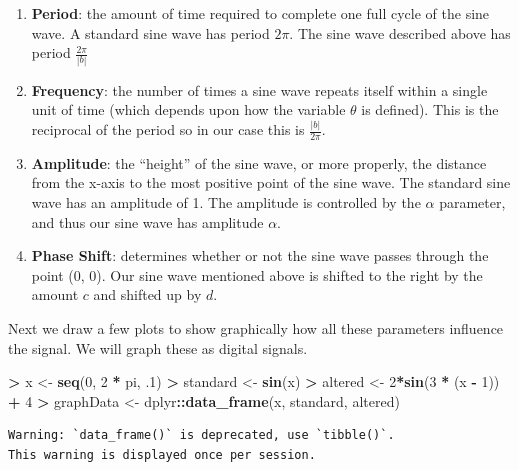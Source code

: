 \documentclass[]{krantz}
\makeatletter
\newenvironment{Shaded}{\begin{snugshade}}{\end{snugshade}}
\newcommand{\DecValTok}[1]{\textcolor[rgb]{0.06,0.06,0.06}{#1}}
\newcommand{\FloatTok}[1]{\textcolor[rgb]{0.06,0.06,0.06}{#1}}
\newcommand{\KeywordTok}[1]{\textcolor[rgb]{0.27,0.27,0.27}{\textbf{#1}}}
\newcommand{\NormalTok}[1]{#1}
\newcommand{\OperatorTok}[1]{\textcolor[rgb]{0.43,0.43,0.43}{\textbf{#1}}}
\newcommand{\StringTok}[1]{\textcolor[rgb]{0.5,0.5,0.5}{#1}}
\providecommand{\tightlist}{%
  \setlength{\itemsep}{0pt}\setlength{\parskip}{0pt}}
\newenvironment{kframe}{%
\medskip{}
\setlength{\fboxsep}{.8em}
 \def\at@end@of@kframe{}%
 \ifinner\ifhmode%
  \def\at@end@of@kframe{\end{minipage}}%
  \begin{minipage}{\columnwidth}%
 \fi\fi%
 \def\FrameCommand##1{\hskip\@totalleftmargin \hskip-\fboxsep
 \colorbox{shadecolor}{##1}\hskip-\fboxsep
     \hskip-\linewidth \hskip-\@totalleftmargin \hskip\columnwidth}%
 \MakeFramed {\advance\hsize-\width
   \@totalleftmargin\z@ \linewidth\hsize
   \@setminipage}}%
 {\par\unskip\endMakeFramed%
 \at@end@of@kframe}
\renewenvironment{Shaded}{\begin{kframe}}{\end{kframe}}
\makeatother
\begin{document}
\begin{enumerate}
\def\labelenumi{\arabic{enumi}.}
\tightlist
\item
  \textbf{Period}: the amount of time required to complete one full cycle of the sine wave. A standard sine wave has period \(2\pi\). The sine wave described above has period \(\frac{2\pi}{|b|}\)
\item
  \textbf{Frequency}: the number of times a sine wave repeats itself within a single unit of time (which depends upon how the variable \(\theta\) is defined). This is the reciprocal of the period so in our case this is \(\frac{|b|}{2\pi}\).
\item
  \textbf{Amplitude}: the ``height'' of the sine wave, or more properly, the distance from the x-axis to the most positive point of the sine wave. The standard sine wave has an amplitude of 1. The amplitude is controlled by the \(\alpha\) parameter, and thus our sine wave has amplitude \(\alpha\).
\item
  \textbf{Phase Shift}: determines whether or not the sine wave passes through the point (0, 0). Our sine wave mentioned above is shifted to the right by the amount \(c\) and shifted up by \(d\).
\end{enumerate}

Next we draw a few plots to show graphically how all these parameters influence the signal. We will graph these as digital signals.

\begin{Shaded}
\begin{Highlighting}[]
\OperatorTok{>}\StringTok{ }\NormalTok{x <-}\StringTok{ }\KeywordTok{seq}\NormalTok{(}\DecValTok{0}\NormalTok{, }\DecValTok{2} \OperatorTok{*}\StringTok{ }\NormalTok{pi, }\FloatTok{.1}\NormalTok{)}
\OperatorTok{>}\StringTok{ }\NormalTok{standard <-}\StringTok{ }\KeywordTok{sin}\NormalTok{(x)}
\OperatorTok{>}\StringTok{ }\NormalTok{altered <-}\StringTok{ }\DecValTok{2}\OperatorTok{*}\KeywordTok{sin}\NormalTok{(}\DecValTok{3} \OperatorTok{*}\StringTok{ }\NormalTok{(x }\OperatorTok{-}\StringTok{ }\DecValTok{1}\NormalTok{)) }\OperatorTok{+}\StringTok{ }\DecValTok{4}
\OperatorTok{>}\StringTok{ }\NormalTok{graphData <-}\StringTok{ }\NormalTok{dplyr}\OperatorTok{::}\KeywordTok{data_frame}\NormalTok{(x, standard, altered)}
\end{Highlighting}
\end{Shaded}

\begin{verbatim}
Warning: `data_frame()` is deprecated, use `tibble()`.
This warning is displayed once per session.
\end{verbatim}
\end{document}
